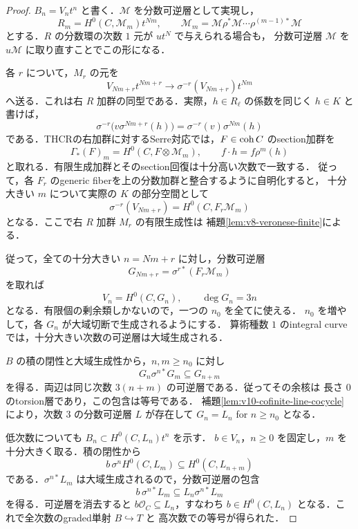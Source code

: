 \documentclass[11pt,a4paper]{ltjsarticle}
\begin{document}
\begin{proof}
$B_n=V_nt^n$ と書く．$\mathcal M$ を分数可逆層として実現し，
\[
 R_m=H^0(C,\mathcal M_m)t^{Nm},\qquad
 \mathcal M_m=\mathcal M\rho^*\mathcal M\cdots\rho^{(m-1)*}\mathcal M
\]
とする．$R$ の分数環の次数 $1$ 元が $ut^N$ で与えられる場合も，
分数可逆層 $\mathcal M$ を $u\mathcal M$ に取り直すことでこの形になる．

各 $r$ について，$M_r$ の元を
\[
 V_{Nm+r}t^{Nm+r}\longrightarrow
       \sigma^{-r}(V_{Nm+r})t^{Nm}
\]
へ送る．これは右 $R$ 加群の同型である．実際，$h\in R_\ell$ の係数を同じく
$h\in K$ と書けば，
\[
 \sigma^{-r}\bigl(v\sigma^{Nm+r}(h)\bigr)
 =\sigma^{-r}(v)\sigma^{Nm}(h)
\]
である．THCRの右加群に対するSerre対応では，$F\in\operatorname{coh} C$ のsection加群を
\[
 \Gamma_*(F)_m=H^0(C,F\otimes\mathcal M_m),\qquad
 f\cdot h=f\rho^m(h)
\]
と取れる．有限生成加群とそのsection回復は十分高い次数で一致する．
従って，各 $F_r$ のgeneric fiberを上の分数加群と整合するように自明化すると，
十分大きい $m$ について実際の $K$ の部分空間として
\[
 \sigma^{-r}(V_{Nm+r})=H^0(C,F_r\mathcal M_m)
\]
となる．ここで右 $R$ 加群 $M_r$ の有限生成性は
補題\ref{lem:v8-veronese-finite}による．

従って，全ての十分大きい $n=Nm+r$ に対し，分数可逆層
\[
 G_{Nm+r}=\sigma^{r*}(F_r\mathcal M_m)
\]
を取れば
\[
 V_n=H^0(C,G_n),\qquad \deg G_n=3n
\]
となる．有限個の剰余類しかないので，一つの $n_0$ を全てに使える．
$n_0$ を増やして，各 $G_n$ が大域切断で生成されるようにする．
算術種数 $1$ のintegral curveでは，十分大きい次数の可逆層は大域生成される．

$B$ の積の閉性と大域生成性から，$n,m\ge n_0$ に対し
\[
 G_n\sigma^{n*}G_m\subseteq G_{n+m}
\]
を得る．両辺は同じ次数 $3(n+m)$ の可逆層である．従ってその余核は
長さ $0$ のtorsion層であり，この包含は等号である．
補題\ref{lem:v10-cofinite-line-cocycle}により，次数 $3$ の分数可逆層 $L$ が存在して
$G_n=L_n$ for $n\ge n_0$ となる．

低次数についても $B_n\subset H^0(C,L_n)t^n$ を示す．
$b\in V_n$，$n\ge0$ を固定し，$m$ を十分大きく取る．積の閉性から
\[
 b\,\sigma^n H^0(C,L_m)\subseteq H^0(C,L_{n+m})
\]
である．$\sigma^{n*}L_m$ は大域生成されるので，分数可逆層の包含
\[
 b\,\sigma^{n*}L_m\subseteq L_n\sigma^{n*}L_m
\]
を得る．可逆層を消去すると $b\mathcal O_C\subseteq L_n$，すなわち
$b\in H^0(C,L_n)$ となる．これで全次数のgraded単射 $B\hookrightarrow T$ と
高次数での等号が得られた．


\end{proof}
\end{document}
